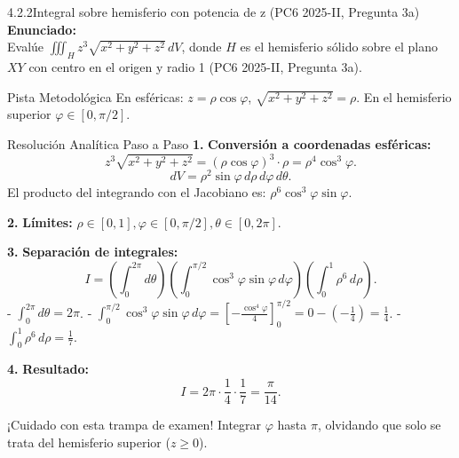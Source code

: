 \documentclass[11pt,a4paper]{article}
\begin{document}
\begin{nivelbox}{4.2.2}{Integral sobre hemisferio con potencia de z (PC6 2025-II, Pregunta 3a)}
\textbf{Enunciado:}\\
Evalúe $\iiint_H z^3 \sqrt{x^2 + y^2 + z^2} \, dV$, donde $H$ es el hemisferio sólido sobre el plano $XY$ con centro en el origen y radio 1 (PC6 2025-II, Pregunta 3a).

\begin{observacionbox}{Pista Metodológica}
En esféricas: $z = \rho\cos\varphi$, $\sqrt{x^2+y^2+z^2} = \rho$. En el hemisferio superior $\varphi \in [0, \pi/2]$.
\end{observacionbox}

\begin{ejerciciobox}{Resolución Analítica Paso a Paso}
\smallskip\noindent\textbf{1.} \textbf{Conversión a coordenadas esféricas:}
\[z^3 \sqrt{x^2+y^2+z^2} = (\rho\cos\varphi)^3 \cdot \rho = \rho^4 \cos^3\varphi.\]
\[dV = \rho^2 \sin\varphi \, d\rho \, d\varphi \, d\theta.\]
El producto del integrando con el Jacobiano es: $\rho^6 \cos^3\varphi \sin\varphi$.

\smallskip\noindent\textbf{2.} \textbf{Límites:} $\rho \in [0, 1], \varphi \in [0, \pi/2], \theta \in [0, 2\pi]$.

\smallskip\noindent\textbf{3.} \textbf{Separación de integrales:}
\[I = \left( \int_0^{2\pi} d\theta \right) \left( \int_0^{\pi/2} \cos^3\varphi \sin\varphi \, d\varphi \right) \left( \int_0^1 \rho^6 \, d\rho \right).\]
- $\int_0^{2\pi} d\theta = 2\pi$.
- $\int_0^{\pi/2} \cos^3\varphi \sin\varphi \, d\varphi = \left[ -\frac{\cos^4\varphi}{4} \right]_0^{\pi/2} = 0 - \left(-\frac{1}{4}\right) = \frac{1}{4}$.
- $\int_0^1 \rho^6 \, d\rho = \frac{1}{7}$.

\smallskip\noindent\textbf{4.} \textbf{Resultado:}
\[I = 2\pi \cdot \frac{1}{4} \cdot \frac{1}{7} = \frac{\pi}{14}.\]
\end{ejerciciobox}

\begin{errorbox}{¡Cuidado con esta trampa de examen!}
Integrar $\varphi$ hasta $\pi$, olvidando que solo se trata del hemisferio superior ($z \ge 0$).
\end{errorbox}
\end{nivelbox}
\bigskip
\end{document}
